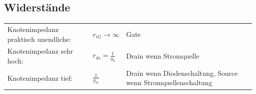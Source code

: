 \subsection{Widerstände}
\begin{tabular}{lll}
	Knotenimpedanz praktisch unendliche: &$r_{iG}\rightarrow \infty$ & Gate \\
	Knotenimpedanz sehr hoch: &$r_{ds} = \frac{1}{g_0}$ & Drain wenn Stromquelle\\
	Knotenimpedanz tief: &$\frac{1}{g_m}$ & Drain wenn Diodenschaltung, Source wenn Stromquellenschaltung \\
\end{tabular}
